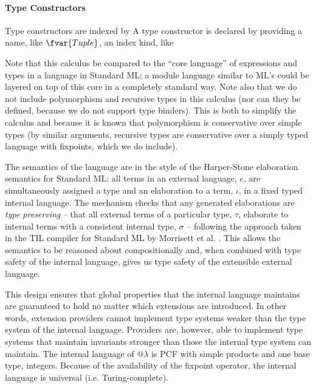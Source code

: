 \paragraph{Type Constructors} Type constructors are indexed by A type constructor is declared by providing a name, like $\fvar{Tuple}$, an index kind, like %

Note that this calculus be compared to the ``core language'' of expressions and types in a language in Standard ML; a module language similar to ML's could be layered on top of this core in a completely standard way. Note also that we do not include polymorphism and recursive types in this calculus (nor can they be defined, because we do not support type binders). This is both to simplify the calculus and because it is known that polymorphism is conservative over simple types \cite{breazu1990polymorphism} (by similar arguments, recursive types are conservative over a simply typed language with fixpoints, which we do include).

The semantics of the language are in the style of the Harper-Stone elaboration semantics for Standard ML: all terms in an external language, $e$, are simultaneously assigned a type and an elaboration to a term, $\iota$, in a fixed typed internal language. The mechanism checks that any generated elaborations are \emph{type preserving} -- that all external terms of a particular type, $\tau$, elaborate to internal terms with a consistent internal type, $\sigma$ -- following the approach taken in the TIL compiler for Standard ML by Morrisett et al. \cite{TIL}. This allows the semantics to be reasoned about compositionally and, when combined with type safety of the internal language, gives us type safety of the extensible external language. 

This design ensures that global properties that the internal language maintains are guaranteed to hold no matter which extensions are introduced. In other words, extension providers cannot implement type systems weaker than the type system of the internal language. Providers are, however, able to implement type systems that maintain invariants stronger than those the internal type system can maintain. The internal language of @$\lambda$ is PCF with simple products and one base type, integers. Because of the availability of the fixpoint operator, the internal language is universal (i.e. Turing-complete).

